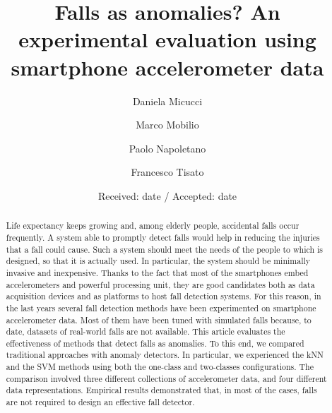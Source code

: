\documentclass[twocolumn]{svjour3}          \smartqed  \usepackage[draft]{hyperref}
\begin{document}
\title{Falls as anomalies? An experimental evaluation using smartphone accelerometer data}



\author{Daniela Micucci   \and
        Marco Mobilio \and
        Paolo Napoletano \and
        Francesco Tisato }







\date{Received: date / Accepted: date}



\maketitle

\begin{abstract}
Life expectancy keeps growing and, among elderly people, accidental falls occur frequently. A system able to promptly detect falls would help in reducing the injuries that a fall could cause. Such a system should meet the needs of the people to which is designed, so that it is actually used. In particular, the system should be minimally invasive and inexpensive. Thanks to the fact that most of the smartphones embed accelerometers and powerful processing unit, they are good candidates both as data acquisition devices and as platforms to host fall detection systems. For this reason, in the last years several fall detection methods have been experimented on smartphone accelerometer data. Most of them have been tuned with simulated falls because, to date, datasets of real-world falls are not available.
This article evaluates the effectiveness of methods that detect falls as anomalies. To this end, we compared traditional approaches with anomaly detectors. In particular, we experienced the kNN and the SVM methods using both the one-class and two-classes configurations. The comparison involved three different collections of accelerometer data, and four different data representations. Empirical results demonstrated that, in most of the cases, falls are not required to design an effective fall detector.



\end{abstract}
\end{document}
